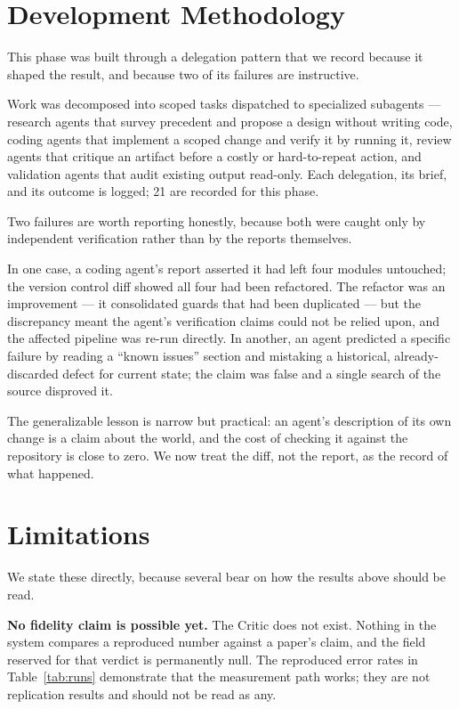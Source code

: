 \documentclass[10pt,twocolumn]{article}
\begin{document}
\section{Development Methodology}
\label{sec:methodology}

This phase was built through a delegation pattern that we record because it shaped the
result, and because two of its failures are instructive.

Work was decomposed into scoped tasks dispatched to specialized subagents --- research
agents that survey precedent and propose a design without writing code, coding agents that
implement a scoped change and verify it by running it, review agents that critique an
artifact before a costly or hard-to-repeat action, and validation agents that audit
existing output read-only. Each delegation, its brief, and its outcome is logged; 21 are
recorded for this phase.

Two failures are worth reporting honestly, because both were caught only by independent
verification rather than by the reports themselves.

In one case, a coding agent's report asserted it had left four modules untouched; the
version control diff showed all four had been refactored. The refactor was an improvement
--- it consolidated guards that had been duplicated --- but the discrepancy meant the
agent's verification claims could not be relied upon, and the affected pipeline was re-run
directly. In another, an agent predicted a specific failure by reading a ``known issues''
section and mistaking a historical, already-discarded defect for current state; the claim
was false and a single search of the source disproved it.

The generalizable lesson is narrow but practical: an agent's description of its own change
is a claim about the world, and the cost of checking it against the repository is close to
zero. We now treat the diff, not the report, as the record of what happened.

\section{Limitations}
\label{sec:limitations}

We state these directly, because several bear on how the results above should be read.

\textbf{No fidelity claim is possible yet.} The Critic does not exist. Nothing in the
system compares a reproduced number against a paper's claim, and the field reserved for
that verdict is permanently null. The reproduced error rates in Table~\ref{tab:runs}
demonstrate that the measurement path works; they are not replication results and should
not be read as any.
\end{document}
